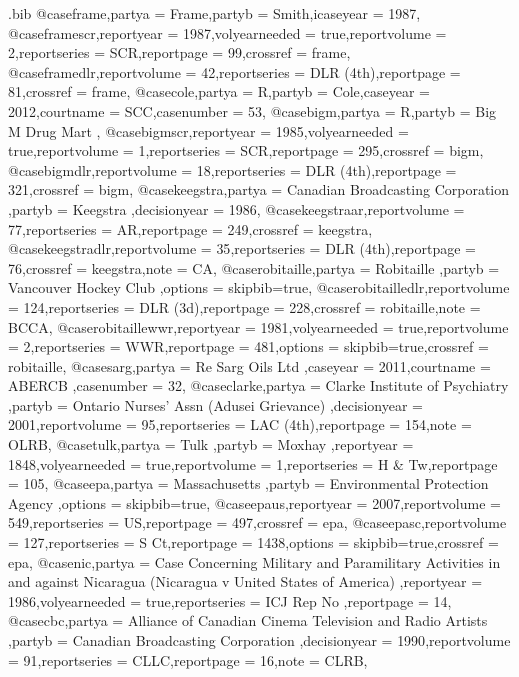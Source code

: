 \begin{filecontents*}{\jobname.bib}
@case{frame,partya = {Frame},partyb = {Smith},icaseyear = {1987},}
@case{framescr,reportyear = {1987},volyearneeded = {true},reportvolume = {2},reportseries = {SCR},reportpage = {99},crossref = {frame},}
@case{framedlr,reportvolume = {42},reportseries = {DLR (4th)},reportpage = {81},crossref = {frame},}
@case{cole,partya = {R},partyb = {Cole},caseyear = {2012},courtname = {SCC},casenumber = {53},}
@case{bigm,partya = {R},partyb = {Big M Drug Mart },}
@case{bigmscr,reportyear = {1985},volyearneeded = {true},reportvolume = {1},reportseries = {SCR},reportpage = {295},crossref = {bigm},}
@case{bigmdlr,reportvolume = {18},reportseries = {DLR (4th)},reportpage = {321},crossref = {bigm},}
@case{keegstra,partya = {Canadian Broadcasting Corporation },partyb = {Keegstra },decisionyear = {1986},}
@case{keegstraar,reportvolume = {77},reportseries = {AR},reportpage = {249},crossref = {keegstra},}
@case{keegstradlr,reportvolume = {35},reportseries = {DLR (4th)},reportpage = {76},crossref = {keegstra},note = {CA},}
@case{robitaille,partya = {Robitaille },partyb = {Vancouver Hockey Club },options = {skipbib=true},}
@case{robitailledlr,reportvolume = {124},reportseries = {DLR (3d)},reportpage = {228},crossref = {robitaille},note = {BCCA},}
@case{robitaillewwr,reportyear = {1981},volyearneeded = {true},reportvolume = {2},reportseries = {WWR},reportpage = {481},options = {skipbib=true},crossref = {robitaille},}
@case{sarg,partya = {Re Sarg Oils Ltd },caseyear = {2011},courtname = {ABERCB },casenumber = {32},}
@case{clarke,partya = {Clarke Institute of Psychiatry },partyb = {Ontario Nurses' Assn (Adusei Grievance) },decisionyear = {2001},reportvolume = {95},reportseries = {LAC (4th)},reportpage = {154},note = {OLRB},}
@case{tulk,partya = {Tulk },partyb = {Moxhay },reportyear = {1848},volyearneeded = {true},reportvolume = {1},reportseries = {H \& Tw},reportpage = {105},}
@case{epa,partya = {Massachusetts },partyb = {Environmental Protection Agency },options = {skipbib=true},}
@case{epaus,reportyear = {2007},reportvolume = {549},reportseries = {US},reportpage = {497},crossref = {epa},}
@case{epasc,reportvolume = {127},reportseries = {S Ct},reportpage = {1438},options = {skipbib=true},crossref = {epa},}
@case{nic,partya = {Case Concerning Military and Paramilitary Activities in and against Nicaragua (Nicaragua v United States of America) },reportyear = {1986},volyearneeded = {true},reportseries = {ICJ Rep No },reportpage = {14},}
@case{cbc,partya = {Alliance of Canadian Cinema Television and Radio Artists },partyb = {Canadian Broadcasting Corporation },decisionyear = {1990},reportvolume = {91},reportseries = {CLLC},reportpage = {16},note = {CLRB},}

\end{filecontents*}
